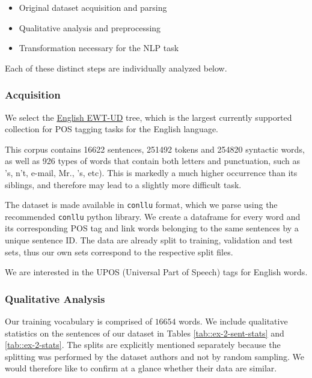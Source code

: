 \documentclass[10pt, a4paper]{article}
\begin{document}
	\begin{itemize}
		\item Original dataset acquisition and parsing
		\item Qualitative analysis and preprocessing
		\item Transformation necessary for the NLP task
	\end{itemize}
	
	Each of these distinct steps are individually analyzed below.
	
	
	\subsubsection{Acquisition}
	
	We select the \href{https://universaldependencies.org/treebanks/en_ewt/index.html}{English EWT-UD} tree, which is the largest currently supported collection for POS tagging tasks for the English language.
	
	This corpus contains 16622 sentences, 251492 tokens and 254820 syntactic words, as well as 926 types of words that contain both letters and punctuation, such as 's, n't, e-mail, Mr., ’s, etc). This is markedly a much higher occurrence than its siblings, and therefore may lead to a slightly more difficult task.
	
	The dataset is made available in \texttt{conllu} format, which we parse using the recommended \texttt{conllu} python library. We create a dataframe for every word and its corresponding POS tag and link words belonging to the same sentences by a unique sentence ID. The data are already split to training, validation and test sets, thus our own sets correspond to the respective split files.
	
	We are interested in the UPOS (Universal Part of Speech) tags for English words.
	
	\subsubsection{Qualitative Analysis}
	
	Our training vocabulary is comprised of $16654$ words. We include qualitative statistics on the sentences of our dataset in Tables \ref{tab::ex-2-sent-stats} and \ref{tab::ex-2-stats}. The splits are explicitly mentioned separately because the splitting was performed by the dataset authors and not by random sampling. We would therefore like to confirm at a glance whether their data are similar.
	
\end{document}
